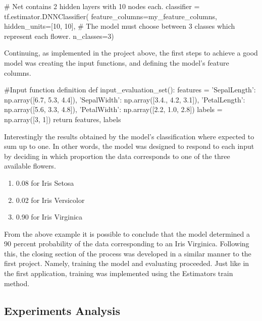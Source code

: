 \begin{tensorflow}[caption={ads}]
# Net contains 2 hidden layers with 10 nodes each.
classifier = tf.estimator.DNNClassifier(
    feature_columns=my_feature_columns,
    hidden_units=[10, 10],
# The model must choose between 3 classes which represent each flower.
    n_classes=3)
\end{tensorflow}

Continuing, as implemented in the project above, the first steps to achieve a good model was creating the input functions, and defining the model's feature columns. 

\begin{tensorflow}[caption={ads}]
#Input function definition
def input_evaluation_set():
    features = {'SepalLength': np.array([6.7, 5.3, 4.4]),
                'SepalWidth':  np.array([3.4., 4.2, 3.1]),
                'PetalLength': np.array([5.6, 3.3, 4.8]),
                'PetalWidth':  np.array([2.2, 1.0, 2.8])}
    labels = np.array([3, 1])
    return features, labels
\end{tensorflow}

Interestingly the results obtained by the model's classification where expected to sum up to one. In other words, the model was designed to respond to each input by deciding in which proportion the data corresponds to one of the three available flowers. 

\begin{enumerate}
 \item 0.08 for Iris Setosa
 \item 0.02 for Iris Versicolor
 \item 0.90 for Iris Virginica
\end{enumerate}

From the above example it is possible to conclude that the model determined a 90 percent probability of the data corresponding to an Iris Virginica.   Following this, the closing section of the process was developed in a similar manner to the first project. Namely, training the model and evaluating proceeded. Just like in the first  application, training was implemented using the Estimators train method. 

\subsection{Experiments Analysis}

